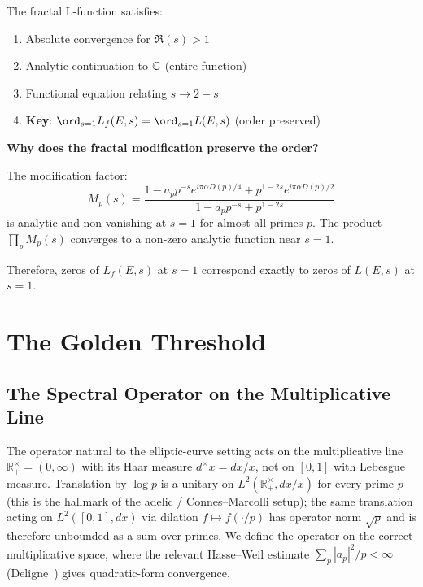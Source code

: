 \begin{proposition}[Properties of $L_f$]\label{prop:fractal-l-properties}
The fractal L-function satisfies:
\begin{enumerate}
\item Absolute convergence for $\Re(s) > 1$
\item Analytic continuation to $\mathbb{C}$ (entire function)
\item Functional equation relating $s \to 2-s$
\item \textbf{Key}: $\ord_{s=1} L_f(E,s) = \ord_{s=1} L(E,s)$ (order preserved)
\end{enumerate}
\end{proposition}

\begin{level3}
\textbf{Why does the fractal modification preserve the order?}

The modification factor:
\begin{equation}
M_p(s) = \frac{1 - a_p p^{-s} e^{i\pi\alpha D(p)/4} + p^{1-2s} e^{i\pi\alpha D(p)/2}}{1 - a_p p^{-s} + p^{1-2s}}
\end{equation}
is analytic and non-vanishing at $s = 1$ for almost all primes $p$. The product $\prod_p M_p(s)$ converges to a non-zero analytic function near $s = 1$.

Therefore, zeros of $L_f(E,s)$ at $s=1$ correspond exactly to zeros of $L(E,s)$ at $s=1$.
\end{level3}

\section{The Golden Threshold}

\subsection{The Spectral Operator on the Multiplicative Line}

The operator natural to the elliptic-curve setting acts on the multiplicative line $\mathbb{R}_+^\times = (0, \infty)$ with its Haar measure $d^\times x = dx/x$, not on $[0,1]$ with Lebesgue measure. Translation by $\log p$ is a unitary on $L^2(\mathbb{R}_+^\times, dx/x)$ for every prime $p$ (this is the hallmark of the adelic / Connes--Marcolli setup\cite{connes1998,connesmarcolli2008}); the same translation acting on $L^2([0,1], dx)$ via dilation $f \mapsto f(\cdot/p)$ has operator norm $\sqrt{p}$ and is therefore unbounded as a sum over primes. We define the operator on the correct multiplicative space, where the relevant Hasse--Weil estimate $\sum_p |a_p|^2/p < \infty$ (Deligne~\cite{deligne1974weil}) gives quadratic-form convergence.

